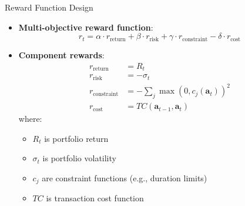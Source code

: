 \documentclass{beamer}
\begin{document}
\begin{frame}{Reward Function Design}
\begin{itemize}
    \item \textbf{Multi-objective reward function}:
    \begin{equation}
    r_t = \alpha \cdot r_{\text{return}} + \beta \cdot r_{\text{risk}} + \gamma \cdot r_{\text{constraint}} - \delta \cdot r_{\text{cost}}
    \end{equation}
    
    \item \textbf{Component rewards}:
    \begin{align}
    r_{\text{return}} &= R_t \\
    r_{\text{risk}} &= -\sigma_t \\
    r_{\text{constraint}} &= -\sum_j \max(0, c_j(\mathbf{a}_t))^2 \\
    r_{\text{cost}} &= TC(\mathbf{a}_{t-1}, \mathbf{a}_t)
    \end{align}
    where:
    \begin{itemize}
        \item $R_t$ is portfolio return
        \item $\sigma_t$ is portfolio volatility
        \item $c_j$ are constraint functions (e.g., duration limits)
        \item $TC$ is transaction cost function
    \end{itemize}
\end{itemize}
\end{frame}
\end{document}

